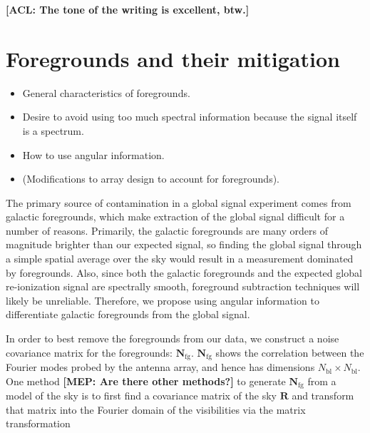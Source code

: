 \documentclass[twolcolumn,apj]{emulateapj}
\newcommand{\Nfg}{\mathbf{N}_{\textrm{fg}}}
\newcommand{\R}{\mathbf{R}}
\newcommand{\Nbl}{N_{\textrm{bl}}}
\newcommand{\acl}[1]{{\color{red} \textbf{[ACL:  #1]}}}
\newcommand{\mep}[1]{{\color{applegreen} \textbf{[MEP:  #1]}}}
\begin{document}
\acl{The tone of the writing is excellent, btw.}
%

\section{Foregrounds and their mitigation}
\label{sec:Foregrounds}
\begin{itemize}
\item General characteristics of foregrounds.
\item Desire to avoid using too much spectral information because the signal itself is a spectrum.
\item How to use angular information.
\item (Modifications to array design to account for foregrounds).
\end{itemize}

The primary source of contamination in a global signal experiment comes from galactic foregrounds, which make extraction of the global signal difficult for a number of reasons. Primarily, the galactic foregrounds are many orders of magnitude brighter than our expected signal, so finding the global signal through a simple spatial average over the sky would result in a measurement dominated by foregrounds. Also, since both the galactic foregrounds and the expected global re-ionization signal are spectrally smooth, foreground subtraction techniques will likely be unreliable. Therefore, we propose using angular information to differentiate galactic foregrounds from the global signal. 

In order to best remove the foregrounds from our data, we construct a noise covariance matrix for the foregrounds: $\Nfg$. $\Nfg$  shows the correlation between the Fourier modes probed by the antenna array, and hence has dimensions $\Nbl \times \Nbl$. One method \mep{Are there other methods?} to generate $\Nfg$ from a model of the sky is to first find a covariance matrix of the sky $\R$ and transform that matrix into the Fourier domain of the visibilities via the matrix transformation 
\end{document}
